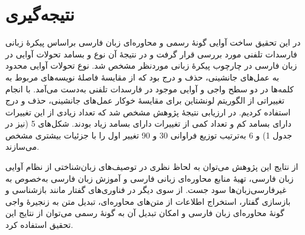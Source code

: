 \documentclass[12pt,onecolumn,a4paper]{article}
\begin{document}
    \section{نتیجه‌گیری}
    در این تحقیق  ساخت آوایی گونهٔ رسمی و محاوره‌ای زبان فارسی براساس پیکرهٔ زبانی فارسدات تلفنی مورد بررسی قرار گرفت و در نتیجهٔ آن نوع و بسامد تحولات آوایی در زبان فارسی در چارچوب پیکرهٔ زبانی موردنظر مشخص شد. نوع تحولات آوایی محدود به عمل‌های جانشینی، حذف و درج بود که از مقایسهٔ فاصلهٔ نویسه‌های مربوط به کلمه‌ها در دو سطح واجی و آوایی موجود در فارسدات تلفنی به‌دست می‌آمد. با انجام تغییراتی از الگوریتم لونشتاین برای مقایسهٔ خوکار عمل‌های جانشینی، حذف و درج استفاده کردیم. در ارزیابی نتیجهٔ پژوهش مشخص شد که تعداد زیادی از این تغییرات دارای بسامد کم و تعداد کمی از تغییرات دارای بسامد زیاد بودند. شکل‌های 5 (نیز در جدول 1) و 6 به‌ترتیب توزیع فراوانی 30  و 90 تغییر اول را با جزئیات بیشتری مشخص می‌سازند.
    \par
    از نتایج این پژوهش می‌توان به لحاظ نظری در توصیف‌های زبان‌شناختی از نظام آوایی زبان فارسی، تهیهٔ منابع محاوره‌ای زبانی فارسی و آموزش زبان فارسی به‌خصوص به غیرفارسی‌زبان‌ها سود جست. از سوی دیگر  در فناوری‌های گفتار مانند بازشناسی و بازسازی گفتار، استخراج اطلاعات از متن‌های محاوره‌ای، تبدیل متن به زنجیرهٔ واجی گونهٔ محاوره‌ای زبان فارسی و امکان تبدیل آن به گونهٔ رسمی می‌توان از نتایج این تحقیق استفاده کرد.

    {\mfo
    
    }
\end{document}
